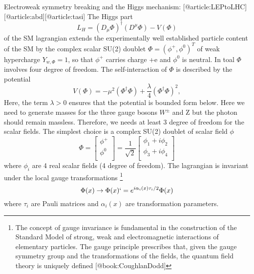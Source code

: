 Electroweak symmetry breaking and the Higgs mechanism: [@article:LEPtoLHC] [@article:abd][@article:tasi]
The Higgs part
    \begin{equation}
    L_H=(D_{\mu}\Phi)^{\dagger}(D^{\mu}\Phi)-V(\Phi)
    \end{equation}
of the SM lagrangian extends the experimentally well established particle content of the SM by the complex scalar SU(2) doublet $\Phi = (\phi^{+},\phi^0)^T$ of weak hypercharge $Y_{w,\Phi}=1$, so that $\phi^{+}$ carries charge +e and $\phi^0$ is neutral. In toal $\Phi$ involves four degree of freedom. The self-interaction of $\Phi$ is described by the potential
    \begin{equation}
    V(\Phi)=-\mu^2(\Phi^{\dagger}\Phi)+\frac{\lambda}{4}(\Phi^{\dagger}\Phi)^2,
    \end{equation}
Here, the term $\lambda > 0$ ensures that the potential is bounded form below. Here we need to generate masses for the three gauge bosons $W^{\pm}$ and Z but the photon should remain massless. Therefore, we needs at least 3 degree of freedom for the scalar fields. The simplest choice is a complex SU(2) doublet of scalar field $\phi$
    \begin{equation}\label{mat2}
    \Phi=
        \begin{bmatrix}
        \phi^+  \\
        \phi^0  \\
        \end{bmatrix}
    =\frac{1}{\sqrt{2}}
        \begin{bmatrix}
        \phi_1 + i\phi_2    \\
        \phi_3 + i\phi_4    \\
        \end{bmatrix}
    \end{equation}
where $\phi_i$ are 4 real scalar fields (4 degree of freedom). The lagrangian is invariant under the local gauge transformations \footnote{The concept of gauge invariance is fundamental in the construction of the Standard Model of strong, weak and electromagnetic interactions of elementary particles. The gauge principle prescribes that, given the gauge symmetry group and the transformations of the fields, the quantum field theory is uniquely defined [@book:CoughlanDodd]}
    \begin{equation}
    \Phi (x) \rightarrow \Phi(x)`=e^{i\alpha_i(x)\tau_i /2}\Phi(x)
    \end{equation}
where $\tau_i$ are Pauli matrices and $\alpha_i(x)$ are transformation parameters.

